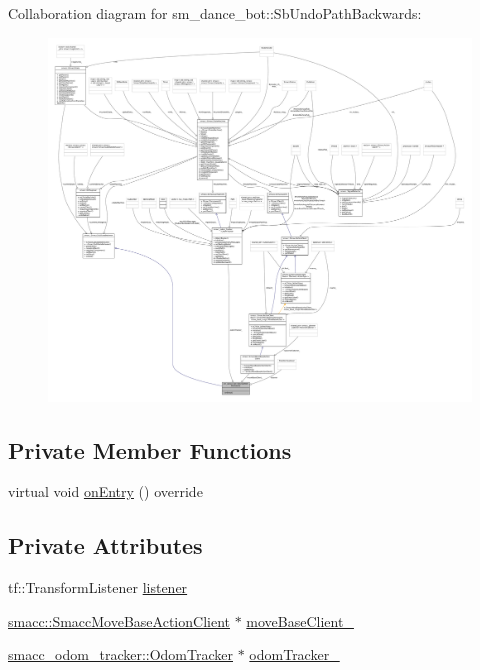 Collaboration diagram for sm\+\_\+dance\+\_\+bot\+:\+:Sb\+Undo\+Path\+Backwards\+:
\nopagebreak
\begin{figure}[H]
\begin{center}
\leavevmode
\includegraphics[width=350pt]{classsm__dance__bot_1_1SbUndoPathBackwards__coll__graph}
\end{center}
\end{figure}
\subsection*{Private Member Functions}
\begin{DoxyCompactItemize}
\item 
virtual void \hyperlink{classsm__dance__bot_1_1SbUndoPathBackwards_aeb54ed14aeaf2adbebf92b92e2384c73}{on\+Entry} () override
\end{DoxyCompactItemize}
\subsection*{Private Attributes}
\begin{DoxyCompactItemize}
\item 
tf\+::\+Transform\+Listener \hyperlink{classsm__dance__bot_1_1SbUndoPathBackwards_a3720e6f85cea1f760c85d0e3b42e3bb5}{listener}
\item 
\hyperlink{classsmacc_1_1SmaccMoveBaseActionClient}{smacc\+::\+Smacc\+Move\+Base\+Action\+Client} $\ast$ \hyperlink{classsm__dance__bot_1_1SbUndoPathBackwards_adb2a5465cde104c31739daa299cdde2d}{move\+Base\+Client\+\_\+}
\item 
\hyperlink{classsmacc__odom__tracker_1_1OdomTracker}{smacc\+\_\+odom\+\_\+tracker\+::\+Odom\+Tracker} $\ast$ \hyperlink{classsm__dance__bot_1_1SbUndoPathBackwards_aa35572a97ab8c00aac3d34c95c43e6bb}{odom\+Tracker\+\_\+}
\end{DoxyCompactItemize}
